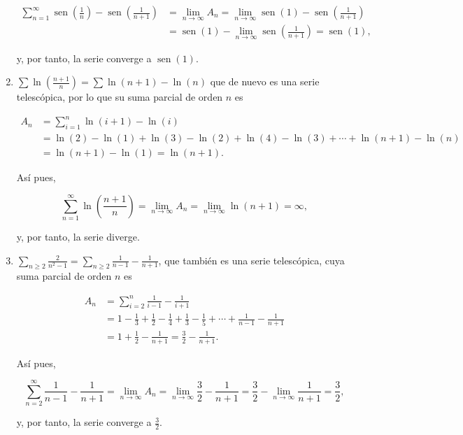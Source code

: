 \documentclass[
  a4paper,
]{scrreport}
\theoremstyle{definition}
\theoremstyle{remark}
\begin{document}
\begin{tcolorbox}
\begin{enumerate}
  \begin{align*}
   \sum_{n=1}^\infty  \operatorname{sen}\left(\frac{1}{n}\right) - \operatorname{sen}\left(\frac{1}{n+1}\right) &= \lim_{n\to\infty} A_n = \lim_{n\to\infty} \operatorname{sen}(1)- \operatorname{sen}\left(\frac{1}{n+1}\right) \\ 
   &= \operatorname{sen}(1)- \lim_{n\to\infty}\operatorname{sen}\left(\frac{1}{n+1}\right) = \operatorname{sen}(1),
   \end{align*}

  y, por tanto, la serie converge a \(\operatorname{sen}(1)\).
\item
  \(\sum \ln\left(\frac{n+1}{n}\right) = \sum \ln(n+1)-\ln(n)\) que de
  nuevo es una serie telescópica, por lo que su suma parcial de orden
  \(n\) es

  \begin{align*}
   A_n &= \sum_{i=1}^n \ln(i+1)-\ln(i) \\ 
   &= \ln(2)-\ln(1)+\ln(3)-\ln(2)+\ln(4)-\ln(3)+\cdots +\ln(n+1)-\ln(n) \\ 
   &= \ln(n+1)-\ln(1) = \ln(n+1).
   \end{align*}

  Así pues,

  \[
   \sum_{n=1}^\infty \ln\left(\frac{n+1}{n}\right) = \lim_{n\to\infty} A_n = \lim_{n\to\infty} \ln(n+1) =\infty,
   \]

  y, por tanto, la serie diverge.
\item
  \(\sum_{n\geq 2} \frac{2}{n^2-1} = \sum_{n\geq 2} \frac{1}{n-1}-\frac{1}{n+1}\),
  que también es una serie telescópica, cuya suma parcial de orden \(n\)
  es

  \begin{align*}
   A_n &= \sum_{i=2}^n \frac{1}{i-1}-\frac{1}{i+1} \\ 
   &= 1-\frac{1}{3}+\frac{1}{2}-\frac{1}{4}+\frac{1}{3}-\frac{1}{5}+\cdots + \frac{1}{n-1}-\frac{1}{n+1} \\ 
   &= 1+\frac{1}{2}-\frac{1}{n+1} = \frac{3}{2}-\frac{1}{n+1}.
   \end{align*}

  Así pues,

  \[
   \sum_{n=2}^\infty \frac{1}{n-1}-\frac{1}{n+1} = \lim_{n\to\infty} A_n = \lim_{n\to\infty}\frac{3}{2}-\frac{1}{n+1} = \frac{3}{2}-\lim_{n\to\infty}\frac{1}{n+1} =\frac{3}{2},
   \]

  y, por tanto, la serie converge a \(\frac{3}{2}\).
\end{enumerate}

\end{tcolorbox}
\end{document}
